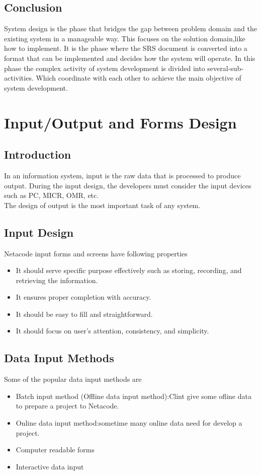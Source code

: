 \documentclass[a4paper,12pt]{report}
\begin{document}
\section{Conclusion}
System design is the phase that bridges the gap between problem domain and the existing system in a manageable way. This focuses on the solution domain,like how to implement. It is the phase where the SRS document is converted into a format that can be implemented and decides how the system will operate. In this phase the complex activity of system development is divided into several-sub-activities. Which coordinate with each other to achieve the main objective of system development.









\chapter{Input/Output and Forms Design}
\section{Introduction}
In an information system, input is the raw data that is processed to produce output. During the input design, the developers must consider the input devices such as PC, MICR, OMR, etc.\\The design of output is the most important task of any system.
\section{Input Design}
Netacode input forms and screens have following properties 
\begin{itemize}
	\item	It should serve specific purpose effectively such as storing, recording, and retrieving the information.
	\item	It ensures proper completion with accuracy.
	\item It should be easy to fill and straightforward.
	\item	It should focus on user’s attention, consistency, and simplicity.
\end{itemize}


\section{Data Input Methods}
Some of the popular data input methods are 
\begin{itemize}
	\item 	Batch input method (Offline data input method):Clint give some ofline data to prepare a project to Netacode.
	\item 	Online data input method:sometime many online data need for develop a project.
	\item 	Computer readable forms
	\item 	Interactive data input
\end{itemize}
\end{document}
